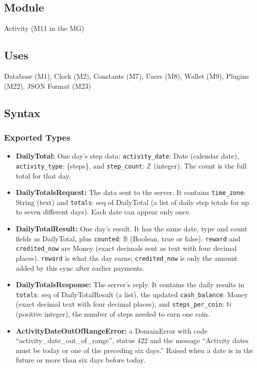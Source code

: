 \documentclass[12pt, titlepage]{article}
\begin{document}
\subsection{Module}

Activity (M11 in the MG)

\subsection{Uses}

Database (M1), Clock (M2), Constants (M7), Users (M8), Wallet (M9), Plugins
(M22), JSON Format (M23)

\subsection{Syntax}

\subsubsection{Exported Types}

\begin{itemize}
\raggedright
\item \textbf{DailyTotal:} One day's step data:
  \texttt{activity\_date}: Date (calendar date),
  \texttt{activity\_type}: \{steps\}, and \texttt{step\_count}:
  $\mathbb{Z}$ (integer). The count is the full total for that day.
\item \textbf{DailyTotalsRequest:} The data sent to the server. It contains
  \texttt{time\_zone}: String (text) and \texttt{totals}: seq of DailyTotal
  (a list of daily step totals for up to seven different days). Each date
  can appear only once.
\item \textbf{DailyTotalResult:} One day's result. It has the same date,
  type and count fields as DailyTotal, plus \texttt{counted}: $\mathbb{B}$
  (Boolean, true or false). \texttt{reward} and \texttt{credited\_now} are
  Money (exact decimals sent as text with four decimal places).
  \texttt{reward} is what the day earns; \texttt{credited\_now} is only the
  amount added by this sync after earlier payments.
\item \textbf{DailyTotalsResponse:} The server's reply. It contains the
  daily results in \texttt{totals}: seq of DailyTotalResult (a list), the
  updated \texttt{cash\_balance}: Money (exact decimal text with four decimal
  places), and \texttt{steps\_per\_coin}: $\mathbb{N}$ (positive integer),
  the number of steps needed to earn one coin.
\item \textbf{ActivityDateOutOfRangeError:} a DomainError with code
  ``activity\_date\_out\_of\_range'', status 422 and the message ``Activity
  dates must be today or one of the preceding six days.'' Raised when a date
  is in the future or more than six days before today.
\end{itemize}
\end{document}
